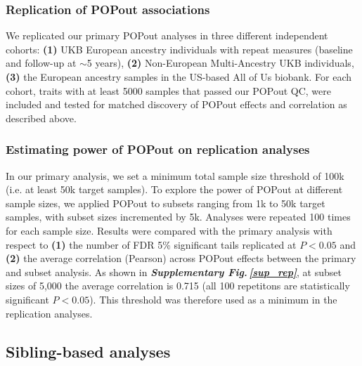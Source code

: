 \documentclass[12pt]{zHenriquesLab-StyleBioRxiv}
\newcommand\sref[1]{\normalsize{\textbf{\textit{Supplementary Fig.\,\ref{#1}}}}\normalsize{}}
\begin{document}
{\subsubsection*{Replication of POPout associations} 
We replicated our primary POPout analyses in three different
independent cohorts: \textbf{(1)} UKB European ancestry individuals
with repeat measures (baseline and follow-up at $\sim$5 years),
\textbf{(2)} Non-European Multi-Ancestry UKB individuals, \textbf{(3)}
the European ancestry samples in the US-based All of Us biobank. For
each cohort, traits with at least 5000 samples that passed our POPout
QC, were included and tested for matched discovery of POPout effects
and correlation as described above.

\subsubsection*{Estimating power of POPout on replication analyses}
In our primary analysis, we set a minimum total sample size threshold
of 100k (i.e. at least 50k target samples). To explore the power of
{\color{green}
POPout at different sample sizes, we applied POPout to subsets ranging
from 1k to 50k target samples, with subset sizes incremented by 5k.
Analyses were repeated 100 times for each sample size. Results were
compared with the primary analysis with respect to \textbf{(1)}
the number of FDR 5\% significant tails replicated at $P<0.05$ and 
\textbf{(2)} the average correlation (Pearson) across POPout effects 
between the primary and subset analysis. As shown in \sref{sup_rep}, 
at subset sizes of 5,000 the average correlation is 0.715 
(all 100 repetitons are statistically significant $P<0.05$).  This 
threshold was therefore used as a minimum in the replication analyses. 
}
}



%
\subsection*{Sibling-based analyses} \label{sec:methods:sibs}  
%
\end{document}
